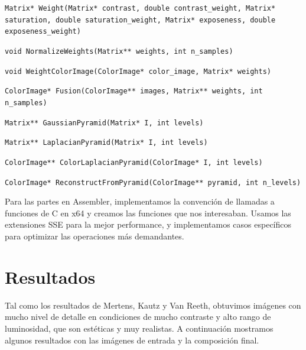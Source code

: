 \documentclass[a4paper,10pt]{article}
\begin{document}
            \texttt{Matrix* Weight(Matrix* contrast, double contrast\_weight, Matrix* saturation, double saturation\_weight, Matrix* exposeness, double exposeness\_weight)}

            \texttt{void NormalizeWeights(Matrix** weights, int n\_samples)}

            \texttt{void WeightColorImage(ColorImage* color\_image, Matrix* weights)}

            \texttt{ColorImage* Fusion(ColorImage** images, Matrix** weights, int n\_samples)}

            \texttt{Matrix** GaussianPyramid(Matrix* I, int levels)}

            \texttt{Matrix** LaplacianPyramid(Matrix* I, int levels)}

            \texttt{ColorImage** ColorLaplacianPyramid(ColorImage* I, int levels)}

            \texttt{ColorImage* ReconstructFromPyramid(ColorImage** pyramid, int n\_levels)}
            
            \bigskip
            Para las partes en Assembler, implementamos la convención de llamadas a funciones de C en x64 y creamos las funciones que nos interesaban. Usamos las extensiones SSE para la mejor performance, y implementamos casos específicos para optimizar las operaciones más demandantes.

    \section{Resultados}

        Tal como los resultados de Mertens, Kautz y Van Reeth, obtuvimos imágenes con mucho nivel de detalle en condiciones de mucho contraste y alto rango de luminosidad, que son estéticas y muy realistas. A continuación mostramos algunos resultados con las imágenes de entrada y la composición final.
        
\end{document}
